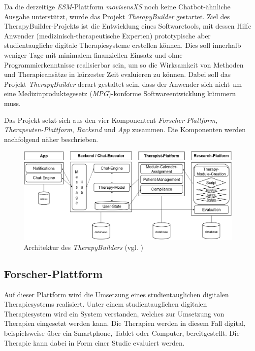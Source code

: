 Da die derzeitige \emph{ESM}-Plattform \emph{movisensXS} noch keine Chatbot-ähnliche Ausgabe unterstützt, wurde das Projekt \emph{TherapyBuilder} gestartet. Ziel des TherapyBuilder-Projekts ist die Entwicklung eines Softwaretools, mit dessen Hilfe Anwender (medizinisch-therapeutische Experten) prototypische aber studientaugliche digitale Therapiesysteme erstellen können. Dies soll innerhalb weniger Tage mit minimalem finanziellen Einsatz und ohne Programmierkenntnisse realisierbar sein, um so die Wirksamkeit von Methoden und Therapieansätze in kürzester Zeit evaluieren zu können. Dabei soll das Projekt \emph{TherapyBuilder} derart gestaltet sein, dass der Anwender sich nicht um eine Medizinproduktegesetz (\emph{MPG})-konforme Softwareentwicklung kümmern muss. 

Das Projekt setzt sich aus den vier Komponentent \emph{Forscher-Plattform}, \emph{Therapeuten-Plattform}, \emph{Backend} und \emph{App} zusammen. Die Komponenten werden nachfolgend näher beschrieben.

\begin{figure}[h]
\centering
\includegraphics[width=1\textwidth]{pictures/TherapyBuilder}
\caption{Architektur des \emph{TherapyBuilders} (vgl. \citep{benjaminhoff})}
\label{therapyBuilder}
\end{figure}


\subsection{Forscher-Plattform}

Auf dieser Plattform wird die Umsetzung eines studientauglichen digitalen Therapiesystems realisiert. Unter einem studientauglichen digitalen Therapiesystem wird ein System verstanden, welches zur Umsetzung von Therapien eingesetzt werden kann. Die Therapien werden in diesem Fall digital, beispielsweise über ein Smartphone, Tablet oder Computer, bereitgestellt. Die Therapie kann dabei in Form einer Studie evaluiert werden.

